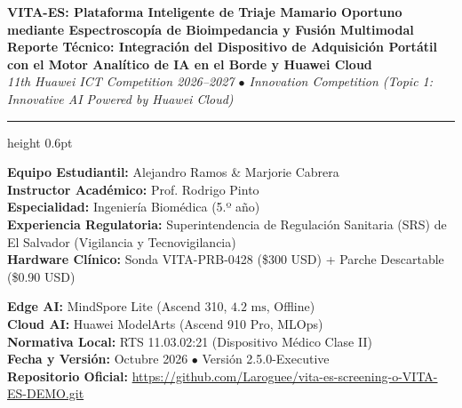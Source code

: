 \documentclass[11pt,a4paper]{article}
\begin{document}
\begin{tcolorbox}[colback=white, colframe=wordblue, arc=4pt, boxrule=1pt, left=12pt, right=12pt, top=12pt, bottom=12pt]
    \begin{center}
        {\color{wordblue}\huge \textbf{VITA-ES: Plataforma Inteligente de Triaje Mamario Oportuno mediante Espectroscopía de Bioimpedancia y Fusión Multimodal}} \\[0.3cm]
        {\color{wordsteelblue}\large \textbf{Reporte Técnico: Integración del Dispositivo de Adquisición Portátil con el Motor Analítico de IA en el Borde y Huawei Cloud}} \\[0.2cm]
        {\normalsize \textit{11th Huawei ICT Competition 2026--2027 $\bullet$ Innovation Competition (Topic 1: Innovative AI Powered by Huawei Cloud)}}
    \end{center}
    
    \vspace{0.2cm}
    \hrule height 0.6pt
    \vspace{0.25cm}
    
    \begin{minipage}[t]{0.48\textwidth}
        \footnotesize
        \textbf{Equipo Estudiantil:} Alejandro Ramos \& Marjorie Cabrera \\
        \textbf{Instructor Académico:} Prof. Rodrigo Pinto \\
        \textbf{Especialidad:} Ingeniería Biomédica (5.º año) \\
        \textbf{Experiencia Regulatoria:} Superintendencia de Regulación Sanitaria (SRS) de El Salvador (Vigilancia y Tecnovigilancia) \\
        \textbf{Hardware Clínico:} Sonda VITA-PRB-0428 (\$300 USD) + Parche Descartable (\$0.90 USD)
    \end{minipage}
    \hfill
    \begin{minipage}[t]{0.48\textwidth}
        \footnotesize
        \textbf{Edge AI:} MindSpore Lite (Ascend 310, $4.2\text{ ms}$, Offline) \\
        \textbf{Cloud AI:} Huawei ModelArts (Ascend 910 Pro, MLOps) \\
        \textbf{Normativa Local:} RTS 11.03.02:21 (Dispositivo Médico Clase II) \\
        \textbf{Fecha y Versión:} Octubre 2026 $\bullet$ Versión 2.5.0-Executive \\
        \textbf{Repositorio Oficial:} \url{https://github.com/Laroguee/vita-es-screening-o-VITA-ES-DEMO.git}
    \end{minipage}
\end{tcolorbox}
\end{document}
